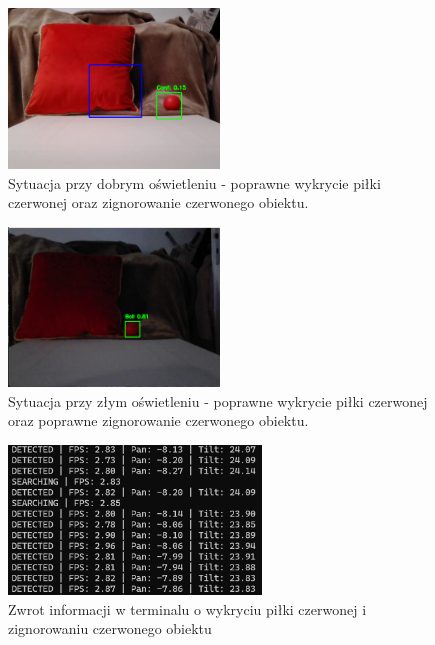 \documentclass[a4paper,twoside,12pt]{book}
\begin{document}
\begin{figure}[!hb]
    \centering
    \includegraphics[width=0.5\textwidth]{Images/Porownanie/Yolo7 robot/Zrzut ekranu 2025-01-02 194354.png}
    \caption{Sytuacja przy dobrym oświetleniu - poprawne wykrycie piłki czerwonej oraz zignorowanie czerwonego obiektu.}
    \label{fig:Wykrycie piłki3}
\end{figure}

\begin{figure}[!hb]
    \centering
    \includegraphics[width=0.5\textwidth]{Images/Porownanie/Yolo7 robot/Zrzut ekranu 2025-01-02 194641.png}
    \caption{Sytuacja przy złym oświetleniu - poprawne wykrycie piłki czerwonej oraz poprawne zignorowanie czerwonego obiektu.}
    \label{fig:Wykrycie piłki4}
\end{figure}


\begin{figure}[h]
    \centering
    \includegraphics[width=0.6\textwidth]{Images/Porownanie/Yolo7 robot/pilka i poduszka zgaszone swiatlo dalej wykrywa.png}
    \caption{Zwrot informacji w terminalu o wykryciu piłki czerwonej i zignorowaniu czerwonego obiektu}
    \label{fig:Wykrycie piłki5}
\end{figure}
\end{document}

